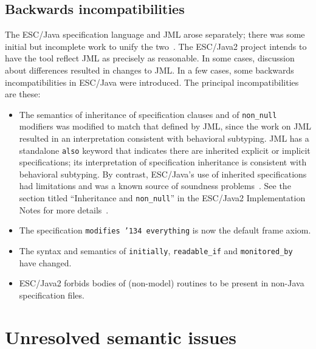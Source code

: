\documentclass{llncs}
\begin{document}
\subsection{Backwards incompatibilities}
The ESC/Java specification language and JML arose separately; there
was some initial but incomplete work to unify the
two~\cite{Leavens-etal03}.  The ESC/Java2 project intends to have the
tool reflect JML as precisely as reasonable.  In some cases,
discussion about differences resulted in changes to JML.  In a few
cases, some backwards incompatibilities in ESC/Java were introduced.
The principal incompatibilities are these:
\setlength{\partopsep}{0in}\setlength{\parskip}{0in}\setlength{\itemsep}{0in}\setlength{\topsep}{0in}
\begin{itemize}
\setlength{\partopsep}{0in}\setlength{\parskip}{0in}\setlength{\itemsep}{0in}\setlength{\topsep}{0in}
\item The semantics of inheritance of specification clauses and of
  \texttt{non\_null} modifiers was modified to match that defined by
  JML, since the work on JML resulted in an interpretation consistent
  with behavioral subtyping.  JML has a standalone \texttt{also} keyword
that indicates there are inherited explicit or implicit specifications; its
interpretation of specification inheritance is consistent with behavioral
subtyping.  By contrast, ESC/Java's use of inherited specifications had
limitations and was a known source of soundness problems~\cite{Leino-Nelson-Saxe00}.
See
  the section titled ``Inheritance and \texttt{non\_null}'' in the
  ESC/Java2 Implementation Notes for more
  details~\cite{Cok04-Impl-Notes}.
\item The specification \texttt{modifies \char'134 everything} is now
  the default frame axiom.
\item The syntax and semantics of \texttt{initially},
  \texttt{readable\_if} and \texttt{monitored\_by} have changed.
\item ESC/Java2 forbids bodies of (non-model) routines to be present
  in non-Java specification files.
\end{itemize}

\section{Unresolved semantic issues}
\end{document}
